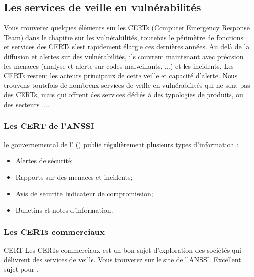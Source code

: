 \uchap{\jobname}

\subsection{Les services de veille en vulnérabilités}

Vous trouverez quelques éléments sur les CERTs (Computer Emergency Response Team) dans le chapitre sur les vulnérabilités, toutefois le périmètre de fonctions et services des CERTs s'est rapidement élargie ces dernières années. Au delà de la diffusion et alertes sur des vulnérabilités, ils couvrent maintenant avec précision les menaces (analyse et alerte sur codes malveillants, ...) et les incidents. Les CERTs restent les acteurs principaux de cette veille et capacité d'alerte.  
Nous trouvons toutefois de nombreux services de veille en vulnérabilités qui ne sont pas des CERTs, mais qui offrent des services dédiés à des typologies de produits, ou des secteurs ....

\subsubsection{Les CERT de l'ANSSI}


le  gouvernemental de l' () publie régulièrement plusieurs types d'information :

\begin{itemize}
  \item Alertes de sécurité;
  \item Rapports sur des menaces et incidents;
  \item Avis de sécurité Indicateur de compromission;
  \item Bulletins et notes d'information.
\end{itemize}



\subsubsection{Les CERTs commerciaux}

\begin{techworkbox}{CERT}
	Les CERTs commerciaux est un bon sujet d'exploration des sociétés qui délivrent des services de veille. Vous trouverez 
	 sur le site de l'ANSSI.  Excellent sujet pour \fichetech.
\end{techworkbox}

